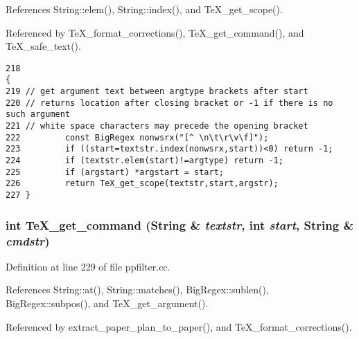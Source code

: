 References String::elem(), String::index(), and Te\-X\_\-get\_\-scope().

Referenced by Te\-X\_\-format\_\-corrections(), Te\-X\_\-get\_\-command(), and Te\-X\_\-safe\_\-text().



\footnotesize\begin{verbatim}218                                                                                                         {
219 // get argument text between argtype brackets after start
220 // returns location after closing bracket or -1 if there is no such argument
221 // white space characters may precede the opening bracket
222         const BigRegex nonwsrx("[^ \n\t\r\v\f]");
223         if ((start=textstr.index(nonwsrx,start))<0) return -1;
224         if (textstr.elem(start)!=argtype) return -1;
225         if (argstart) *argstart = start;
226         return TeX_get_scope(textstr,start,argstr);
227 }
\end{verbatim}\normalsize 
{}
\subsubsection{\setlength{\rightskip}{0pt plus 5cm}int Te\-X\_\-get\_\-command ({\bf String} \& {\em textstr}, int {\em start}, {\bf String} \& {\em cmdstr})}\label{ppfilter_8cc_a6}




Definition at line 229 of file ppfilter.cc.

References String::at(), String::matches(), Big\-Regex::sublen(), Big\-Regex::subpos(), and Te\-X\_\-get\_\-argument().

Referenced by extract\_\-paper\_\-plan\_\-to\_\-paper(), and Te\-X\_\-format\_\-corrections().



